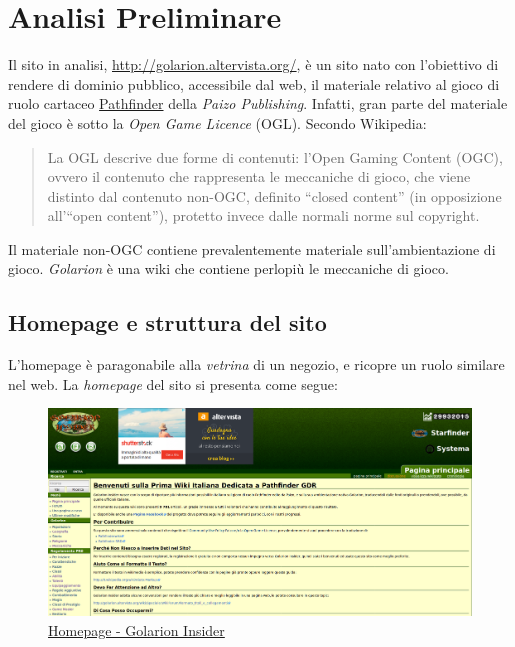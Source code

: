 \section{Analisi Preliminare}\label{analisipre}

Il sito in analisi, \url{http://golarion.altervista.org/}, è un sito nato con l'obiettivo di
rendere di dominio pubblico, accessibile dal web, il materiale relativo al gioco di ruolo
cartaceo \href{https://it.wikipedia.org/wiki/Pathfinder_gioco_di_ruolo}{Pathfinder} della \emph{Paizo Publishing}. 
Infatti, gran parte del materiale del gioco è sotto la \emph{Open Game Licence} (OGL). Secondo Wikipedia:
\begin{quote}
    La OGL descrive due forme di contenuti: l'Open Gaming Content (OGC), ovvero il contenuto che 
    rappresenta le meccaniche di gioco, che viene distinto dal contenuto non-OGC, definito ``closed content'' 
    (in opposizione all'``open content''), protetto invece dalle normali norme sul copyright.    
\end{quote}

Il materiale non-OGC contiene prevalentemente materiale sull'ambientazione di gioco. \emph{Golarion} è una 
wiki che contiene perlopiù le meccaniche di gioco.

\subsection{Homepage e struttura del sito}
L'homepage è paragonabile alla \emph{vetrina} di un negozio, e ricopre un ruolo similare nel web.
La \emph{homepage} del sito si presenta come segue:

\begin{figure}[hbt]
    \centering
    \includegraphics[width=\textwidth]{img/home.png}
    \caption{\href{http://golarion.altervista.org/wiki/Pagina_principale}{Homepage - Golarion Insider}}
    \label{homepage}
\end{figure}

